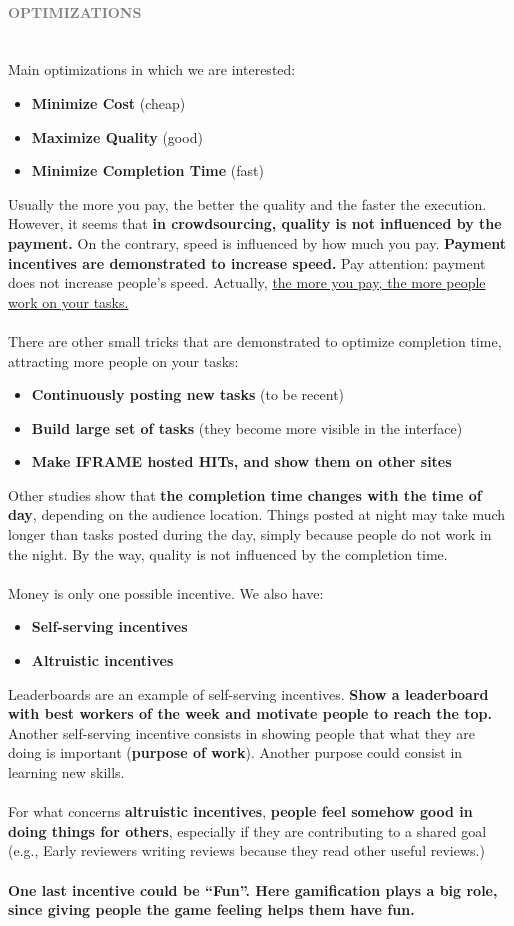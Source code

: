 \documentclass[10pt,a4paper]{article}
\newcommand{\nline}{\\~\\}
\newcommand{\myparagraph}[1]{\paragraph{\normalsize{\textcolor{gray}{\uppercase{\textbf{#1}}}} }\mbox{} \vspace{0.5em}\\}
\begin{document}
\myparagraph{Optimizations}
Main optimizations in which we are interested:
\begin{itemize}
	\item \textbf{Minimize Cost} (cheap)
	\item \textbf{Maximize Quality} (good)
	\item \textbf{Minimize Completion Time} (fast)
\end{itemize}
Usually the more you pay, the better the quality and the faster the execution.
However, it seems that \textbf{in crowdsourcing, quality is not influenced by the payment.} On the contrary, speed is influenced by how much you pay. \textbf{Payment incentives are demonstrated to increase speed.} Pay attention: payment does not increase people's speed. Actually, \uline{the more you pay, the more people work on your tasks.}
\nline
There are other small tricks that are demonstrated to optimize completion time, attracting more people on your tasks:
\begin{itemize}
	\item \textbf{Continuously posting new tasks} (to be recent)
	\item \textbf{Build large set of tasks} (they become more visible in the interface) 
	\item \textbf{Make IFRAME hosted HITs, and show them on other sites}
\end{itemize}
Other studies show that \textbf{the completion time changes with the time of day}, depending on the audience location. Things posted at night may take much longer than tasks posted during the day, simply because people do not work in the night. By the way, quality is not influenced by the completion time.
\nline
Money is only one possible incentive. We also have:
\begin{itemize}
	\item \textbf{Self-serving incentives}
	\item \textbf{Altruistic incentives}
\end{itemize}
Leaderboards are an example of self-serving incentives. \textbf{Show a leaderboard with best workers of the week and motivate people to reach the top. } \\
Another self-serving incentive consists in showing people that what they are doing is important (\textbf{purpose of work}). Another purpose could consist in learning new skills.
\nline
For what concerns \textbf{altruistic incentives}, \textbf{people feel somehow good in doing things for others}, especially if they are contributing to a shared goal (e.g., Early reviewers writing reviews because they read other useful reviews.)
\nline
\textbf{One last incentive could be “Fun”. Here gamification plays a big role, since giving people the game feeling helps them have fun.}
\end{document}
